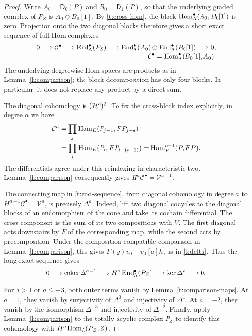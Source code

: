 \begin{proof}
Write $A_0=\mathsf D_0(P)$ and $B_0=\mathsf D_1(P)$, so that the
underlying graded complex of $P_Z$ is $A_0\oplus B_0[1]$.
By \eqref{t:cross-hom}, the block
$\operatorname{Hom}_\Lambda^\bullet(A_0,B_0[1])$ is zero.  Projection onto the two
diagonal blocks therefore gives a short exact sequence of full Hom
complexes
\begin{equation}\label{t:end-sequence}
\begin{split}
 0\longrightarrow\mathcal C^\bullet
 \longrightarrow\operatorname{End}_\Lambda^\bullet(P_Z)
 \longrightarrow
 \operatorname{End}_\Lambda^\bullet(A_0)\oplus
 \operatorname{End}_\Lambda^\bullet(B_0[1])
 \longrightarrow0,\\[-2pt]
 \mathcal C^\bullet=\operatorname{Hom}_\Lambda^\bullet(B_0[1],A_0).
\end{split}
\end{equation}
The underlying degreewise Hom spaces are products as in
Lemma~\ref{h:comparison}; the block decomposition has only four
blocks.  In particular, it does not replace any product by a direct
sum.

The diagonal cohomology is $(\mathcal H^a)^2$.  To fix the cross-block
index explicitly, in degree $a$ we have
\begin{align*}
 \mathcal C^a
 &=\prod_j\operatorname{Hom}_E(P_{j-1},FP_{j-a})\\
 &=\prod_i\operatorname{Hom}_E(P_i,FP_{i-(a-1)})
   =\operatorname{Hom}_E^{a-1}(P,FP).
\end{align*}
The differentials agree under this reindexing in characteristic two.
Lemma~\ref{h:comparison} consequently gives
$H^a\mathcal C^\bullet=\mathcal V^{a-1}$.

The connecting map in \eqref{t:end-sequence}, from diagonal
cohomology in degree $a$ to $H^{a+1}\mathcal C^\bullet=\mathcal V^a$,
is precisely $\Delta^a$.  Indeed, lift two diagonal cocycles to the
diagonal blocks of an endomorphism of the cone and take its
cochain differential.  The cross component is the sum of its two
compositions with $V$.  The first diagonal acts downstairs by $F$
of the corresponding map, while the second acts by precomposition.
Under the composition-compatible comparison in
Lemma~\ref{h:comparison}, this gives
$F(g)v_0+v_0[a]h$, as in \eqref{t:delta}.
Thus the long exact sequence gives
\begin{equation}\label{t:end-cohomology}
 0\longrightarrow\operatorname{coker}\Delta^{a-1}
 \longrightarrow H^a\operatorname{End}_\Lambda^\bullet(P_Z)
 \longrightarrow\ker\Delta^a\longrightarrow0.
\end{equation}

For $a>1$ or $a\leq-3$, both outer terms vanish by
Lemma~\ref{t:comparison-maps}.  At $a=1$, they vanish by surjectivity
of $\Delta^0$ and injectivity of $\Delta^1$.  At $a=-2$, they vanish
by the isomorphism $\Delta^{-3}$ and injectivity of $\Delta^{-2}$.
Finally, apply Lemma~\ref{h:comparison} to the totally acyclic
complex $P_Z$ to identify this cohomology with
$H^a\operatorname{Hom}_\Lambda(P_Z,Z)$.
\end{proof}

